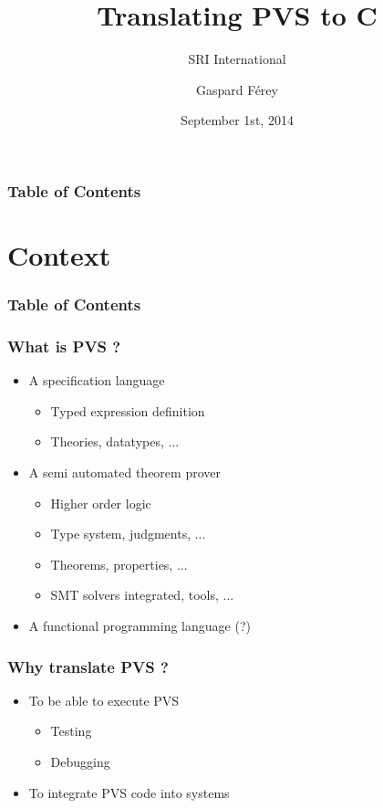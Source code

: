 \documentclass{beamer}
\title[From PVS to C]{Translating PVS to C}
\subtitle{SRI International}
\author[Gaspard Férey]{Gaspard Férey}
\institute{Ecole Polytechnique}
\date{September 1st, 2014}
\begin{document}
\frame{\titlepage}

\begin{frame}
\frametitle{Table of Contents}
\tableofcontents
\end{frame}


\section{Context}

\begin{frame}
\frametitle{Table of Contents}
\tableofcontents[currentsection]
\end{frame}


\begin{frame}
\frametitle{What is PVS ?}

\begin{itemize}
\itemsep2em
\item A specification language
\begin{itemize}
\item Typed expression definition
\item Theories, datatypes, ...
\end{itemize}
\item A semi automated theorem prover
\begin{itemize}
\item Higher order logic
\item Type system, judgments, ...
\item Theorems, properties, ...
\item SMT solvers integrated, tools, ...
\end{itemize}
\item A functional programming language (?)
\end{itemize}

\end{frame}


\begin{frame}
\frametitle{Why translate PVS ?}

\begin{itemize}
\itemsep2em
\item To be able to execute PVS
\begin{itemize}
\item Testing
\item Debugging
\end{itemize}
\item To integrate PVS code into systems
\end{itemize}

\end{frame}
\end{document}

